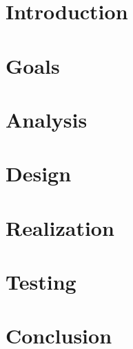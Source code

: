 \chapter{Introduction}
\setcounter{page}{1}



\chapter{Goals}



\chapter{Analysis}



\chapter{Design}



\chapter{Realization}



\chapter{Testing}



\chapter{Conclusion}



